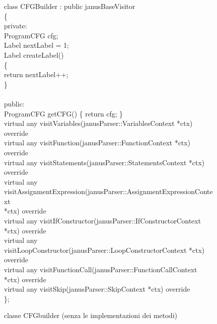 \documentclass{article}
\theoremstyle{plain}
\theoremstyle{definition}
\theoremstyle{plain}
\begin{document}
\begin{figure}[h]
    \centering
    \hspace*{-1.5cm}
    \begin{minipage}{1.5\textwidth}
        \ttfamily 
        class CFGBuilder : public janusBaseVisitor \\
        \{\\
        private:\\
        \hspace*{1em} ProgramCFG cfg;\\
        \hspace*{1em} Label nextLabel = 1;\\
        \hspace*{1em} Label createLabel()\\
        \hspace*{1em} \{\\
        \hspace*{1em} return nextLabel++;\\
        \hspace*{1em} \}\\
        \\
        public:\\
        \hspace*{1em} ProgramCFG getCFG() \{ return cfg; \}\\
        \hspace*{1em} virtual any visitVariables(janusParser::VariablesContext *ctx) override \\
        \hspace*{1em} virtual any visitFunction(janusParser::FunctionContext *ctx) override\\
        \hspace*{1em} virtual any visitStatements(janusParser::StatementsContext *ctx) override\\
        \hspace*{1em} virtual any visitAssignmentExpression(janusParser::AssignmentExpressionContext \\ \hspace*{4em} *ctx) override \\
        \hspace*{1em} virtual any visitIfConstructor(janusParser::IfConstructorContext *ctx) override \\
        \hspace*{1em} virtual any visitLoopConstructor(janusParser::LoopConstructorContext *ctx) override\\
        \hspace*{1em} virtual any visitFunctionCall(janusParser::FunctionCallContext *ctx) override \\
        \hspace*{1em} virtual any visitSkip(janusParser::SkipContext *ctx) override\\
        \}; \\
    \end{minipage}
    \caption{classe CFGbuilder (senza le implementazioni dei metodi)}
    \label{fig:cfgbuilder}
\end{figure}
\end{document}
